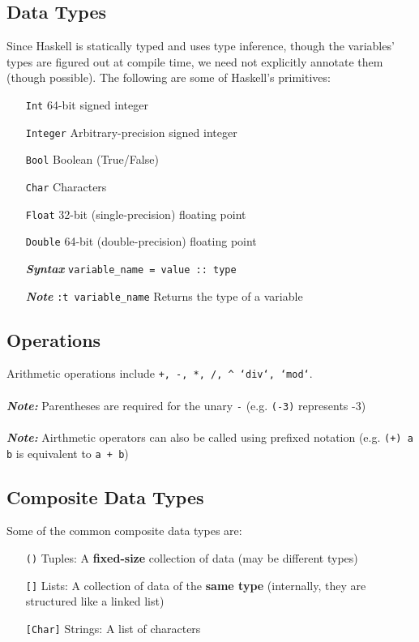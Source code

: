 \documentclass{article}
\begin{document}
\subsection{Data Types}
Since Haskell is statically typed and uses type inference, though the
variables' types are figured out at compile time, we need not
explicitly annotate them (though possible). The following are some of
Haskell's primitives:
\begin{enumerate}[align=left]
\item [\texttt{Int}] 64-bit signed integer
\item [\texttt{Integer}] Arbitrary-precision signed integer
\item [\texttt{Bool}] Boolean (True/False)
\item [\texttt{Char}] Characters  
\item [\texttt{Float}] 32-bit (single-precision) floating point
\item [\texttt{Double}] 64-bit (double-precision) floating point
\item [\textit{\textbf{Syntax}}] \texttt{variable\_name = value :: type}
\item [\textit{\textbf{Note}}] \texttt{:t variable\_name} Returns the type of a variable
\end{enumerate}





\subsection{Operations} Arithmetic operations include \texttt{+, -, *,
  /, \string^ `div`, `mod`}. \\ \\
\textit{\textbf{Note:}} Parentheses are required for the unary \texttt{-}
(e.g. \texttt{(-3)} represents -3) \\ \\
\textit{\textbf{Note:}} Airthmetic operators can also be called using
prefixed notation (e.g. \texttt{(+) a b} is equivalent to \texttt{a + b})





\subsection{Composite Data Types} Some of the common composite data
types are:
\begin{enumerate}[align=left]
\item [\texttt{()}] Tuples: A \textbf{fixed-size} collection of data (may be different types)
\item [\texttt{[]}] Lists: A collection of data of the \textbf{same type} (internally, they
  are structured like a linked list)
\item [\texttt{[Char]}] Strings: A list of characters
\end{enumerate}
\end{document}

